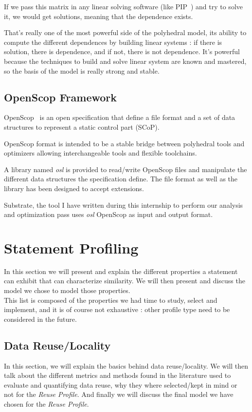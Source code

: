\documentclass[paper=a4, fontsize=11.5pt]{scrartcl}
\numberwithin{equation}{section}        %
\numberwithin{figure}{section}          %
\numberwithin{table}{section}               %
\begin{document}
    If we pass this matrix in any linear solving software (like PIP~\cite{Fea88}) and try to solve it,
    we would get solutions, meaning that the dependence exists.

    \bigskip

    That's really one of the most powerful side of the polyhedral model, its ability to
    compute the different dependences by building linear systems : if there is solution,
    there is dependence, and if not, there is not dependence. It's powerful because
    the techniques to build and solve linear system are known and mastered, so the basis
    of the model is really strong and stable. 


    \subsection{OpenScop Framework}
        OpenScop~\cite{openscop} is an open specification that define a file format
        and a set of data structures to represent a static control part (SCoP).

        OpenScop format is intended to be a stable bridge between polyhedral tools
        and optimizers allowing interchangeable tools and flexible toolchains.

        A library named \textit{osl} is provided to read/write OpenScop files
        and manipulate the different data structures the specification define.
        The file format as well as the library has been designed to accept extensions.

        Substrate, the tool I have written during this internship to perform our analysis
        and optimization pass uses \textit{osl} OpenScop as input and output format.

\section{Statement Profiling}
In this section we will present and explain the different properties a statement can exhibit
that can characterize similarity. We will then present and discuss the model we chose to model
those properties.\\
This list is composed of the properties we had time to study, select and implement,
and it is of course not exhaustive : other profile type need to be considered in the future.
\label{sec:statement_profiling}
    \subsection{Data Reuse/Locality}
        In this section, we will explain the basics behind data reuse/locality. We will then
        talk about the different metrics and methods found in the literature used to evaluate
        and quantifying data reuse, why they where selected/kept in mind or not for the \textit{Reuse Profile}.
        And finally we will discuss the final model we have chosen for the \textit{Reuse Profile}.
\end{document}
